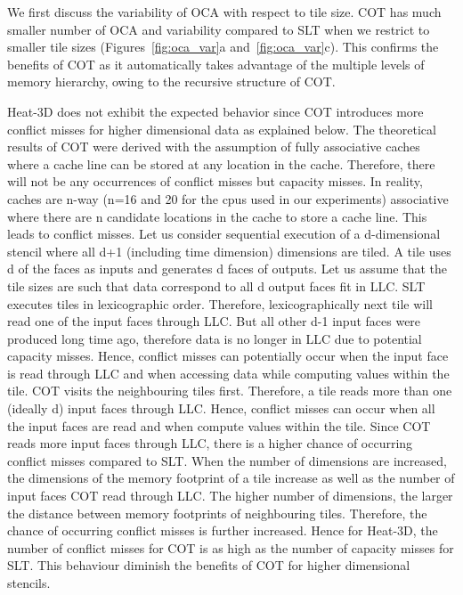 We first discuss the variability of OCA with respect to tile size. COT has
much smaller number of OCA and variability compared to SLT when we restrict to
smaller tile sizes (Figures~\ref{fig:oca_var}a and~\ref{fig:oca_var}c). This
confirms the benefits of COT as it automatically takes advantage of the
multiple levels of memory hierarchy, owing to the recursive structure of COT. 

Heat-3D does not exhibit the expected behavior since COT introduces more
conflict misses for higher dimensional data as explained below.
%
The theoretical results of COT were derived with the assumption of fully
associative caches where a cache line can be stored at any location in the
cache. Therefore, there will not be any occurrences of conflict misses but
capacity misses. In reality, caches are n-way (n=16 and 20 for the cpus used
in our experiments) associative where there are n candidate locations in the
cache to store a cache line. This leads to conflict misses. 
%
Let us consider sequential execution of a d-dimensional stencil where all d+1
(including time dimension) dimensions are tiled.  A tile uses d of the faces
as inputs and generates d faces of outputs.  Let us assume that the tile sizes
are such that data correspond to all d output faces fit in LLC. 
SLT executes tiles in lexicographic order.  Therefore, lexicographically next
tile will read one of the input faces through LLC. But all other d-1 input
faces were produced long time ago, therefore data is no longer in LLC due to
potential capacity misses. Hence, conflict misses can potentially occur when
the input face is read through LLC and when accessing data while computing
values within the tile. COT visits the neighbouring tiles first. Therefore, a
tile reads more than one (ideally d) input faces through LLC. Hence, conflict
misses can occur when all the input faces are read and when compute values
within the tile. Since COT reads more input faces through LLC, there is a
higher chance of occurring conflict misses compared to SLT.  When the number
of dimensions are increased, the dimensions of the  memory footprint of a tile
increase as well as the number of input faces COT read through LLC. The higher
number of dimensions, the larger the distance between memory footprints of
neighbouring tiles. Therefore, the chance of occurring conflict misses is
further increased. Hence for Heat-3D, the number of conflict misses for COT is
as high as the number of capacity misses for SLT. This behaviour diminish the
benefits of COT for higher dimensional stencils.

